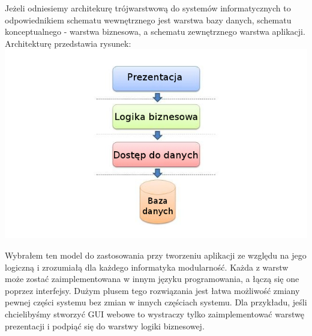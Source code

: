Jeżeli odniesiemy architekurę trójwarstwową do systemów informatycznych to odpowiednikiem schematu wewnętrznego jest warstwa bazy danych, schematu konceptualnego - warstwa biznesowa, a schematu zewnętrznego warstwa aplikacji. Architekturę przedstawia rysunek:
\includegraphics[scale=0.31]{images/3layer-architect}

Wybrałem ten model do zastosowania przy tworzeniu aplikacji ze względu na jego logiczną i zrozumiałą dla każdego informatyka modularność. Każda z warstw może zostać zaimplementowana w innym języku programowania, a łączą się one poprzez interfejsy. Dużym plusem tego rozwiązania jest łatwa możliwość zmiany pewnej części systemu bez zmian w innych częściach systemu. Dla przykładu, jeśli chcielibyśmy stworzyć GUI webowe to wystraczy tylko zaimplementować warstwę prezentacji i podpiąć się do warstwy logiki biznesowej.

